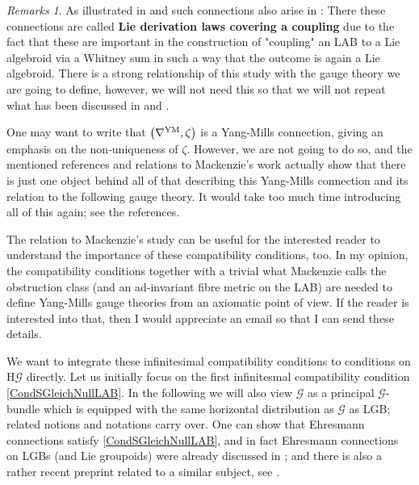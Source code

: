 \documentclass[a4paper,oneside,11pt,bibliography=totoc]{scrartcl}
\theoremstyle{plain}
\theoremstyle{remark}
\newtheorem{remark}[theorem]{Remarks}
\theoremstyle{definition}
\begin{document}
\begin{remark}\label{MackenziesStuffRelation}
\leavevmode\newline
As illustrated in \cite[\S 5.1]{MyThesis} and \cite{My1stpaper} such connections also arise in \cite[\S 7.2, page 271ff.]{mackenzieGeneralTheory}: There these connections are called \textbf{Lie derivation laws covering a coupling} due to the fact that these are important in the construction of "coupling" an LAB to a Lie algebroid via a Whitney sum in such a way that the outcome is again a Lie algebroid. There is a strong relationship of this study with the gauge theory we are going to define, however, we will not need this so that we will not repeat what has been discussed in \cite[\S 5.1]{MyThesis} and \cite{My1stpaper}. 

One may want to write that $\mleft( \nabla^{\mathrm{YM}}, \zeta \mright)$ is a Yang-Mills connection, giving an emphasis on the non-uniqueness of $\zeta$. However, we are not going to do so, and the mentioned references and relations to Mackenzie's work actually show that there is just one object behind all of that describing this Yang-Mills connection and its relation to the following gauge theory. It would take too much time introducing all of this again; see the references.

The relation to Mackenzie's study can be useful for the interested reader to understand the importance of these compatibility conditions, too. In my opinion, the compatibility conditions together with a trivial what Mackenzie calls the obstruction class (and an ad-invariant fibre metric on the LAB) are needed to define Yang-Mills gauge theories from an axiomatic point of view. If the reader is interested into that, then I would appreciate an email so that I can send these details.
\end{remark}

We want to integrate these infinitesimal compatibility conditions to conditions on $\mathrm{H}\mathcal{G}$ directly.
Let us initially focus on the first infinitesmal compatibility condition \eqref{CondSGleichNullLAB}. In the following we will also view $\mathcal{G}$ as a principal $\mathcal{G}$-bundle which is equipped with the same horizontal distribution as $\mathcal{G}$ as LGB; related notions and notations carry over. One can show that Ehresmann connections satisfy \eqref{CondSGleichNullLAB}, and in fact Ehresmann connections on LGBs (and Lie groupoids) were already discussed in \cite{LAURENTGENGOUXStienonXuMultiplicativeForms}; and there is also a rather recent preprint related to a similar subject, see \cite{FernandesMarcutMultiplicativeForms}.
\end{document}
